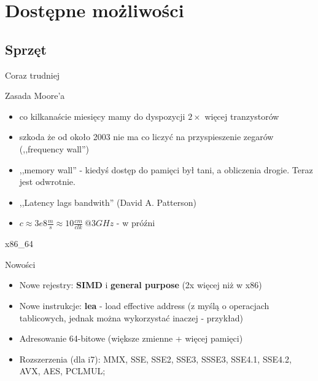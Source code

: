 \section{Dostępne możliwości} %
\subsection{Sprzęt}
\begin{frame}{Coraz trudniej}
	\begin{block}{Zasada Moore'a}
		\begin{itemize}
			\item co kilkanaście miesięcy mamy do dyspozycji $2\times$ więcej tranzystorów
			\item szkoda że od około 2003 nie ma co liczyć na przyspieszenie zegarów (,,frequency wall'')
			\item ,,memory wall'' - kiedyś dostęp do pamięci był tani, a obliczenia drogie. Teraz jest odwrotnie.
			\item ,,Latency lags bandwith'' (David A. Patterson)
			\item $c \approx 3e8\frac{m}{s} \approx 10 \frac{cm}{clk}~@3GHz$ - w próźni
		\end{itemize}
	\end{block}
\end{frame}
\begin{frame}[fragile]{x86\_64}
	\begin{block}{Nowości}
		\begin{itemize}
			\item Nowe rejestry: \textbf{SIMD} i \textbf{general purpose} (2x więcej niż w x86)
			\item Nowe instrukcje: \textbf{lea} - load effective address (z myślą o operacjach
			tablicowych, jednak można wykorzystać inaczej - przykład)
			\item Adresowanie 64-bitowe (większe zmienne + więcej pamięci)
			\item Rozszerzenia (dla i7): MMX, SSE, SSE2, SSE3, SSSE3, SSE4.1, SSE4.2, AVX, AES, PCLMUL;
		\end{itemize}
	\end{block}
\end{frame}
